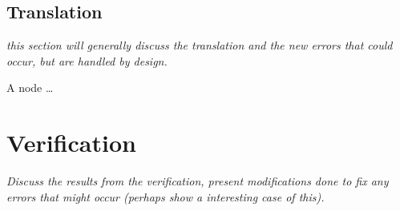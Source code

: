 \subsection{Translation}

\textit{this section will generally discuss the translation and the new errors that could occur, but are handled by design.}


A node \ldots



\section{Verification}

\textit{Discuss the results from the verification, present modifications done to fix any errors that might occur (perhaps show a interesting case of this).}


